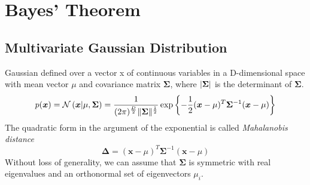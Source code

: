\documentclass[11pt]{article}
\theoremstyle{definition}
\newcommand*\N[1]{\mathcal{N}\left(#1\right)}
\DeclarePairedDelimiter\abs{\lvert}{\rvert}
\DeclarePairedDelimiter\norm{\lVert}{\rVert}
\begin{document}
\section{Bayes' Theorem}
\subsection{Multivariate Gaussian Distribution}
Gaussian defined over a vector x of continuous variables in a D-dimensional space with mean vector $\mu$ and covariance matrix $\bm{\Sigma}$, where $ \abs{\bm{\Sigma}} $ is the determinant of $\bm{\Sigma}$.
\begin{equation*}
	p(\bm{x}) = \N{\bm{x}|\mu, \bm{\Sigma}} = \frac{1}{(2\pi)^{\frac{D}{2}} \norm{\bm{\Sigma}}^{\frac{1}{2}}} \exp\left\{ -\frac{1}{2} (\bm{x} - \mu)^T \bm{\Sigma}^{-1} (\bm{x} - \mu) \right\}
\end{equation*}
The quadratic form in the argument of the exponential is called \emph{Mahalanobis distance}
\begin{equation*}
	\bm{\Delta} = (\bm{x} - \mu)^T \bm{\Sigma}^{-1} (\bm{x} - \mu)
\end{equation*}
Without loss of generality, we can assume that $\bm{\Sigma}$ is symmetric with real eigenvalues and an orthonormal set of eigenvectors $\mu_i$.


\end{document}

